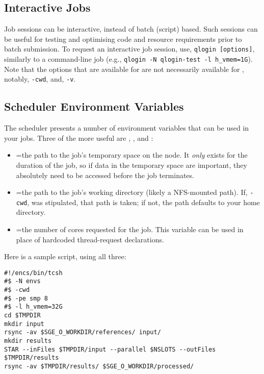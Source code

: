 \documentclass{easychair}
\begin{document}
\subsection{Interactive Jobs}

Job sessions can be interactive, instead of batch (script) based. Such sessions can be  useful for testing and optimising code and resource requirements prior to batch submission. To request an interactive job session, use, \texttt{qlogin [options]}, similarly to a 
 command-line job (e.g., \texttt{qlogin -N qlogin-test -l h\_vmem=1G}). Note that the options that are available for  are not necessarily available for , notably, \texttt{-cwd}, and, \texttt{-v}. 

\subsection{Scheduler Environment Variables}

The scheduler presents a number of environment variables that can be used in your jobs. Three of the more useful are , , and :

\begin{itemize}
\item
{}=the path to the job's temporary space on the node. It \emph{only} exists for the duration of the job, so if data in the temporary space are important, they absolutely need to be accessed before the job terminates.  

\item
{}=the path to the job's working directory (likely a NFS-mounted  path). If, \texttt{-cwd}, was stipulated, that path is taken; if not, the path defaults to your home  directory.  

\item
{}=the number of cores requested for the job. This variable can be used in  place of hardcoded thread-request declarations. 
\end{itemize}

\noindent
Here is a sample script, using all three: 

\begin{verbatim}
#!/encs/bin/tcsh 
#$ -N envs 
#$ -cwd 
#$ -pe smp 8 
#$ -l h_vmem=32G 
cd $TMPDIR 
mkdir input 
rsync -av $SGE_O_WORKDIR/references/ input/ 
mkdir results
STAR --inFiles $TMPDIR/input --parallel $NSLOTS --outFiles $TMPDIR/results 
rsync -av $TMPDIR/results/ $SGE_O_WORKDIR/processed/ 
\end{verbatim}
\end{document}
